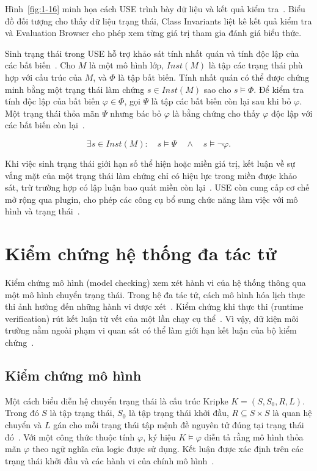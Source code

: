 \documentclass[12pt,a4paper,oneside]{extreport}
\begin{document}
Hình~\ref{fig:1-16} minh họa cách USE trình bày dữ liệu và kết quả kiểm tra~\cite{ref-4}. Biểu đồ đối tượng cho thấy dữ liệu trạng thái, Class Invariants liệt kê kết quả kiểm tra và Evaluation Browser cho phép xem từng giá trị tham gia đánh giá biểu thức.

Sinh trạng thái trong USE hỗ trợ khảo sát tính nhất quán và tính độc lập của các bất biến~\cite{ref-16}. Cho \(M\) là một mô hình lớp, \(Inst(M)\) là tập các trạng thái phù hợp với cấu trúc của \(M\), và \(\Phi\) là tập bất biến. Tính nhất quán có thể được chứng minh bằng một trạng thái làm chứng \(s \in Inst(M)\) sao cho \(s \vDash \Phi\). Để kiểm tra tính độc lập của bất biến \(\varphi \in \Phi\), gọi \(\Psi\) là tập các bất biến còn lại sau khi bỏ \(\varphi\). Một trạng thái thỏa mãn \(\Psi\) nhưng bác bỏ \(\varphi\) là bằng chứng cho thấy \(\varphi\) độc lập với các bất biến còn lại~\cite{ref-4}.

\[\exists s \in Inst(M):\quad s \vDash \Psi\quad \land \quad s \vDash \neg\varphi.\]

Khi việc sinh trạng thái giới hạn số thể hiện hoặc miền giá trị, kết luận về sự vắng mặt của một trạng thái làm chứng chỉ có hiệu lực trong miền được khảo sát, trừ trường hợp có lập luận bao quát miền còn lại~\cite{ref-16}. USE còn cung cấp cơ chế mở rộng qua plugin, cho phép các công cụ bổ sung chức năng làm việc với mô hình và trạng thái~\cite{ref-17}.

\section{Kiểm chứng hệ thống đa tác tử}\label{sec:1-6}

Kiểm chứng mô hình (model checking) xem xét hành vi của hệ thống thông qua một mô hình chuyển trạng thái. Trong hệ đa tác tử, cách mô hình hóa lịch thực thi ảnh hưởng đến những hành vi được xét~\cite{ref-19}. Kiểm chứng khi thực thi (runtime verification) rút kết luận từ vết của một lần chạy cụ thể~\cite{ref-5}. Vì vậy, dữ kiện môi trường nằm ngoài phạm vi quan sát có thể làm giới hạn kết luận của bộ kiểm chứng~\cite{ref-23}.

\subsection{Kiểm chứng mô hình}\label{sec:1-6-1}

Một cách biểu diễn hệ chuyển trạng thái là cấu trúc Kripke \(K = \left( S,S_{0},R,L \right)\). Trong đó \(S\) là tập trạng thái, \(S_{0}\) là tập trạng thái khởi đầu, \(R \subseteq S \times S\) là quan hệ chuyển và \(L\) gán cho mỗi trạng thái tập mệnh đề nguyên tử đúng tại trạng thái đó~\cite{ref-19}. Với một công thức thuộc tính \(\varphi\), ký hiệu \(K \vDash \varphi\) diễn tả rằng mô hình thỏa mãn \(\varphi\) theo ngữ nghĩa của logic được sử dụng. Kết luận được xác định trên các trạng thái khởi đầu và các hành vi của chính mô hình~\cite{ref-19}.
\end{document}

